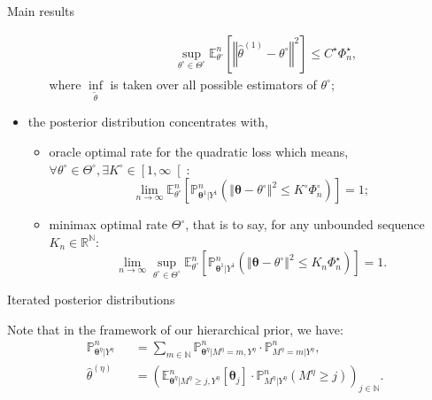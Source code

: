 \documentclass[final,hyperref={pdfpagelabels=false}]{beamer}
\begin{document}
\begin{frame}[t]
\begin{columns}[t]
\begin{column}{.30\textwidth}
\begin{block}{\rule{0pt}{2.5ex} Main results}
\begin{itemize}
\begin{itemize}
\begin{alignat*}{2}
& && \sup\limits_{\theta^{\circ} \in \Theta^{\circ}} \mathbb{E}_{\theta^{\circ}}^{n}\left[\left\Vert \widehat{\theta}^{\left(1\right)} - \theta^{\circ} \right\Vert^{2}\right] \leq C^{\star} \Phi_{n}^{\star},
\end{alignat*}
where $\inf\limits_{\tilde{\theta}}$ is taken over all possible estimators of $\theta^{\circ}$;
	\end{itemize}
	\item the posterior distribution \textcolor{red!90!black}{concentrates with,}
	\begin{itemize}
		\item \textcolor{red!90!black}{oracle optimal rate} for the quadratic loss which means, $\forall \theta^{\circ} \in \Theta^{\circ}, \exists K^{\circ} \in \left[ 1, \infty \right[ :$
\[\lim\limits_{n \rightarrow \infty} \mathbb{E}_{\theta^{\circ}}^{n}\left[\mathbb{P}_{\boldsymbol{\theta}^{1}\vert Y^{1}}^{n}\left(\left\Vert \boldsymbol{\theta} - \theta^{\circ} \right\Vert^{2} \leq K^{\circ} \Phi_{n}^{\circ}\right)\right] = 1;\]
		\item \textcolor{red!90!black}{minimax optimal rate} $\Theta^{\circ}$, that is to say, for any unbounded sequence $K_{n} \in \mathbb{R}^{\mathbb{N}} :$
\[\lim\limits_{n \rightarrow \infty} \sup\limits_{\theta^{\circ} \in \Theta^{\circ}}  \mathbb{E}_{\theta^{\circ}}^{n}\left[\mathbb{P}_{\boldsymbol{\theta}^{1}\vert Y^{1}}^{n}\left(\left\Vert \boldsymbol{\theta} - \theta^{\circ} \right\Vert^{2} \leq K_{n} \Phi_{n}^{\star}\right)\right] = 1.\]
	\end{itemize}

\end{itemize}
\end{block}



\begin{block}{\rule{0pt}{2.5ex} Iterated posterior distributions}
Note that in the framework of our hierarchical prior, we have:
\textcolor{red!90!black}{
\begin{alignat*}{2}
&\mathbb{P}_{\boldsymbol{\theta}^{\eta}\vert Y^{\eta}}^{n} &&= \sum\limits_{m \in \mathbb{N}} \mathbb{P}_{\boldsymbol{\theta}^{\eta} \vert M^{\eta} = m, Y^{\eta}}^{n} \cdot \mathbb{P}^{n}_{M^{\eta} = m \vert Y^{\eta}},\\
&\widehat{\theta}^{\left(\eta\right)} &&= \left(\mathbb{E}_{\boldsymbol{\theta}^{\eta}\vert M^{\eta} \geq j, Y^{\eta}}^{n}\left[\boldsymbol{\theta}_{j}\right] \cdot \mathbb{P}_{M^{\eta} \vert Y^{\eta}}^{n}\left(M^{\eta} \geq j\right)\right)_{j \in \mathbb{N}}.
\end{alignat*}}


\end{block}
\end{column}
\end{columns}
\end{frame}
\end{document}
